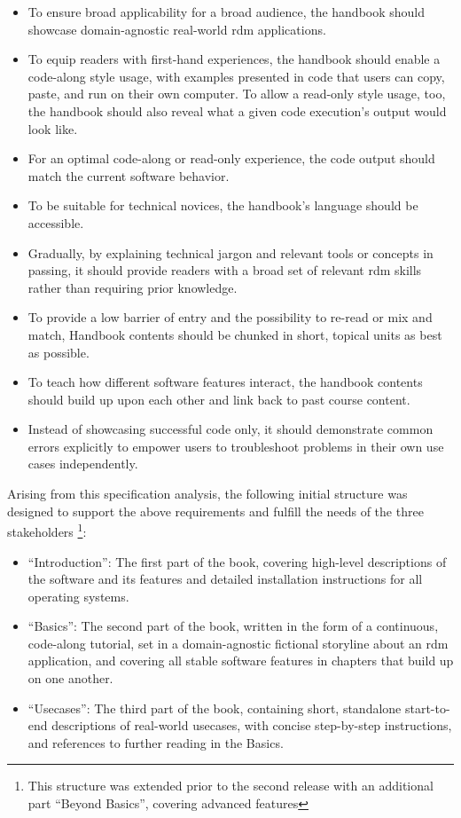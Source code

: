 \begin{itemize}
	\item To ensure broad applicability for a broad audience, the handbook should showcase domain-agnostic real-world \gls{rdm} applications.
	\item To equip readers with first-hand experiences, the handbook should enable a code-along style usage, with examples presented in code that users can copy, paste, and run on their own computer. To allow a read-only style usage, too, the handbook should also reveal what a given code execution's output would look like.
	\item For an optimal code-along or read-only experience, the code output should match the current software behavior.
	\item To be suitable for technical novices, the handbook's language should be accessible.
	\item Gradually, by explaining technical jargon and relevant tools or concepts in passing, it should provide readers with a broad set of relevant \gls{rdm} skills rather than requiring prior knowledge.
	\item To provide a low barrier of entry and the possibility to re-read or mix and match, Handbook contents should be chunked in short, topical units as best as possible.
	\item To teach how different software features interact, the handbook contents should build up upon each other and link back to past course content.
	\item Instead of showcasing successful code only, it should demonstrate common errors explicitly to empower users to troubleshoot problems in their own use cases independently.

\end{itemize}

Arising from this specification analysis, the following initial structure was designed to support the above requirements and fulfill the needs of the three stakeholders \citep{wagner_adina_s_2020_7906718}\footnote{This structure was extended prior to the second release with an additional part ``Beyond Basics'', covering advanced features}:

\begin{itemize}
	\item ``Introduction'': The first part of the book, covering high-level descriptions of the software and its features and detailed installation instructions for all operating systems.
	\item ``Basics'': The second part of the book, written in the form of a continuous, code-along tutorial, set in a domain-agnostic fictional storyline about an \gls{rdm} application, and covering all stable software features in chapters that build up on one another.
	\item ``Usecases'': The third part of the book, containing short, standalone start-to-end descriptions of real-world usecases, with concise step-by-step instructions, and references to further reading in the Basics.
\end{itemize}

